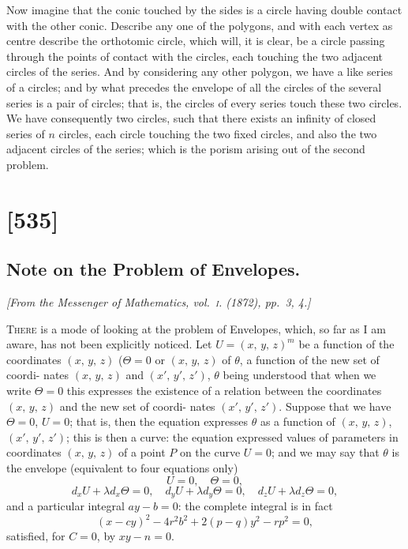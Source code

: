\documentclass[11pt,a4paper]{book}
\begin{document}
Now imagine that the conic touched by the sides is a circle having double contact
with the other conic. Describe any one of the polygons, and with each vertex as
centre describe the orthotomic circle, which will, it is clear, be a circle passing
through the points of contact with the circles, each touching the two adjacent circles of
the series. And by considering any other polygon, we have a like series of a circles;
and by what precedes the envelope of all the circles of the several series is a pair of
circles; that is, the circles of every series touch these two circles. We have consequently
two circles, such that there exists an infinity of closed series of $n$ circles, each circle
touching the two fixed circles, and also the two adjacent circles of the series; which
is the porism arising out of the second problem.

\clearpage

\section{[535]}
\subsection{Note on the Problem of Envelopes.}

\begin{center}
\textit{[From the Messenger of Mathematics, vol.~\textsc{i}. (1872), pp.~3, 4.]}
\end{center}

\noindent\textsc{There} is a mode of looking at the problem of Envelopes, which, so far as I am
aware, has not been explicitly noticed. Let $U = (x,\,y,\,z)^m$ be a function of the
coordinates $(x,\,y,\,z)$ ($\Theta=0$ or $(x,\,y,\,z)$ of $\theta$, a function of the new set of coordi-
nates $(x,\,y,\,z)$ and $(x',\,y',\,z')$, $\theta$ being understood that when we write $\Theta=0$ this expresses
the existence of a relation between the coordinates $(x,\,y,\,z)$ and the new set of coordi-
nates $(x',\,y',\,z')$. Suppose that we have $\Theta=0$, $U = 0$; that is, then the
equation expresses $\theta$ as a function of $(x,\,y,\,z)$, $(x',\,y',\,z')$; this is then a curve: the
equation expressed values of parameters in coordinates $(x,\,y,\,z)$ of a point $P$ on the
curve $U=0$; and we may say that $\theta$ is the envelope (equivalent to four equations
only)
\[
U = 0, \quad \Theta = 0,
\]
\[
d_x U + \lambda d_x \Theta = 0, \quad d_y U + \lambda d_y \Theta = 0, \quad d_z U + \lambda d_z \Theta = 0,
\]
and a particular integral $a y - b = 0$: the complete integral is in fact
\[
(x - cy)^2 - 4r^2 b^2 + 2(p - q)y^2 - rp^2 = 0,
\]
satisfied, for $C = 0$, by $xy - n = 0$.
\end{document}
